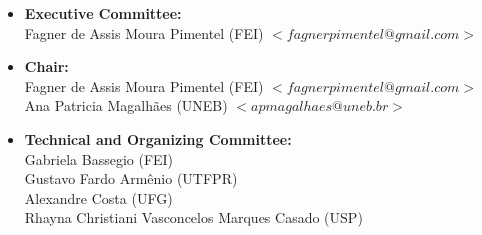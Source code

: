 \begin{itemize}
    \item \textbf{Executive Committee:} \\ 
        Fagner de Assis Moura Pimentel (FEI) $<fagnerpimentel@gmail.com>$
    \item \textbf{Chair:} \\ 
        Fagner de Assis Moura Pimentel (FEI) $<fagnerpimentel@gmail.com>$ \\
        Ana Patricia Magalhães (UNEB) $<apmagalhaes@uneb.br>$ \\
    \item \textbf{Technical and Organizing Committee:} \\ 
        Gabriela Bassegio (FEI) \\
        Gustavo Fardo Armênio (UTFPR) \\
        Alexandre Costa (UFG) \\
        Rhayna Christiani Vasconcelos Marques Casado (USP)
\end{itemize}
